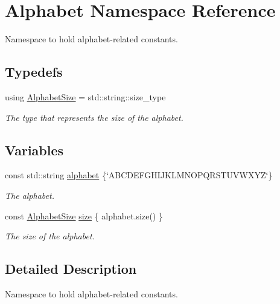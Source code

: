 \hypertarget{namespace_alphabet}{}\section{Alphabet Namespace Reference}
\label{namespace_alphabet}


Namespace to hold alphabet-\/related constants.  


\subsection*{Typedefs}
\begin{DoxyCompactItemize}
\item 
using \hyperlink{namespace_alphabet_a5b8e9bc01c32a14e85582df88cd8275a}{Alphabet\+Size} = std\+::string\+::size\+\_\+type\hypertarget{namespace_alphabet_a5b8e9bc01c32a14e85582df88cd8275a}{}\label{namespace_alphabet_a5b8e9bc01c32a14e85582df88cd8275a}

\begin{DoxyCompactList}\small\item\em The type that represents the size of the alphabet. \end{DoxyCompactList}\end{DoxyCompactItemize}
\subsection*{Variables}
\begin{DoxyCompactItemize}
\item 
const std\+::string \hyperlink{namespace_alphabet_a30996a14237b471696a3f11a3596fcbf}{alphabet} \{\char`\"{}A\+B\+C\+D\+E\+F\+G\+H\+I\+J\+K\+L\+M\+N\+O\+P\+Q\+R\+S\+T\+U\+V\+W\+X\+YZ\char`\"{}\}\hypertarget{namespace_alphabet_a30996a14237b471696a3f11a3596fcbf}{}\label{namespace_alphabet_a30996a14237b471696a3f11a3596fcbf}

\begin{DoxyCompactList}\small\item\em The alphabet. \end{DoxyCompactList}\item 
const \hyperlink{namespace_alphabet_a5b8e9bc01c32a14e85582df88cd8275a}{Alphabet\+Size} \hyperlink{namespace_alphabet_a756e45f4de2154e6d680f5e9f382363a}{size} \{ alphabet.\+size() \}\hypertarget{namespace_alphabet_a756e45f4de2154e6d680f5e9f382363a}{}\label{namespace_alphabet_a756e45f4de2154e6d680f5e9f382363a}

\begin{DoxyCompactList}\small\item\em The size of the alphabet. \end{DoxyCompactList}\end{DoxyCompactItemize}


\subsection{Detailed Description}
Namespace to hold alphabet-\/related constants. 